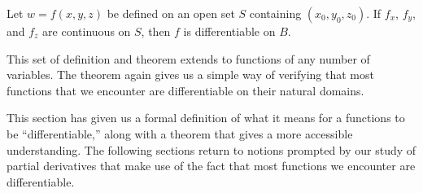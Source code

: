 \begin{theorem}\label{thm:differentiable3}
Let $w=f(x,y,z)$ be defined on an open set $S$ containing $(x_0,y_0,z_0)$. If $f_x$, $f_y$, and $f_z$ are continuous on $S$, then $f$ is differentiable on $B$.
\end{theorem}

This set of definition and theorem extends to functions of any number of variables. The theorem again gives us a simple way of verifying that most functions that we encounter are differentiable on their natural domains.\bigskip

This section has given us a formal definition of what it means for a functions to be ``differentiable,'' along with a theorem that gives a more accessible understanding. The following sections return to notions prompted by our study of partial derivatives that make use of the fact that most functions we encounter are differentiable.

